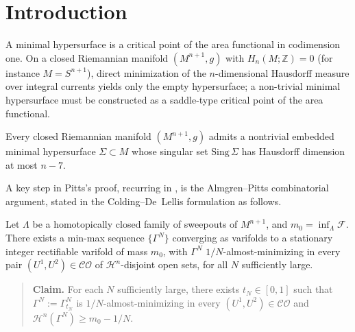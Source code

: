 \section{Introduction}
\label{sec:intro}

A minimal hypersurface is a critical point of the area functional
in codimension one. On a closed Riemannian manifold
$(M^{n+1}, g)$ with $H_n(M;\mathbb{Z}) = 0$ (for instance
$M = S^{n+1}$), direct minimization of the $n$-dimensional
Hausdorff measure over integral currents yields only the empty
hypersurface; a non-trivial minimal hypersurface must be
constructed as a saddle-type critical point of the area
functional.

\begin{theorem}
\label{thm:minmax}
Every closed Riemannian manifold $(M^{n+1}, g)$ admits a
nontrivial embedded minimal hypersurface $\Sigma \subset M$ whose
singular set $\mathrm{Sing}\,\Sigma$ has Hausdorff dimension at
most $n - 7$.
\end{theorem}

A key step in Pitts's proof, recurring in
\cite{CDL03,DLT13,DLR17,DL12,MN14}, is the Almgren--Pitts
combinatorial argument, stated in the Colding--De~Lellis
formulation as follows.

\begin{theorem}
\label{thm:AP-combinatorial}
Let $\Lambda$ be a homotopically closed family of sweepouts of
$M^{n+1}$, and $m_0 = \inf_\Lambda \mathcal{F}$. There exists a
min-max sequence $\{\Gamma^N\}$ converging as varifolds to a
stationary integer rectifiable varifold of mass $m_0$, with
$\Gamma^N$
$1/N$-almost-minimizing in every pair
$(U^1, U^2) \in \mathcal{CO}$ of $\mathcal{H}^n$-disjoint open
sets, for all $N$ sufficiently large.
\end{theorem}


\begin{quote}
\textbf{Claim.} For each $N$ sufficiently large, there exists
$t_N \in [0,1]$ such that $\Gamma^N := \Gamma^N_{t_N}$ is
$1/N$-almost-minimizing in every $(U^1, U^2) \in \mathcal{CO}$
and $\mathcal{H}^n(\Gamma^N) \ge m_0 - 1/N$.
\end{quote}

